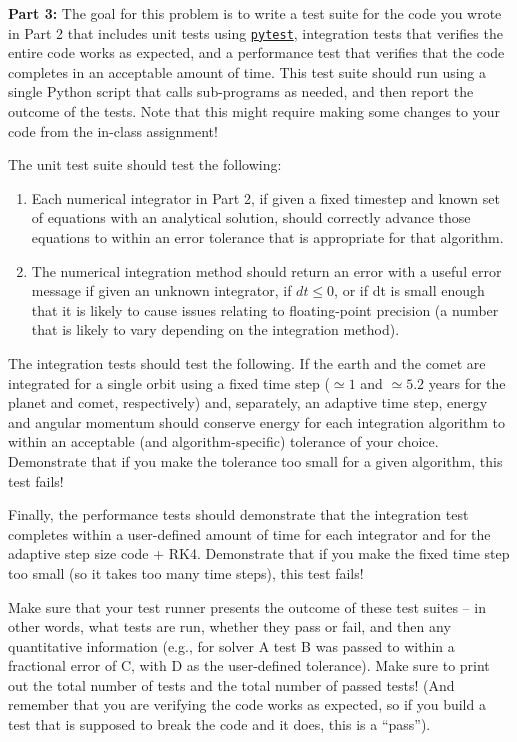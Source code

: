 \documentclass[10pt]{article}
\begin{document}
\newpage
\noindent 
{\large \textbf{Part 3:}}  The goal for this problem is to write a
test suite for the code you wrote in Part 2 that includes unit tests using
\href{https://docs.pytest.org/}{\texttt{pytest}}, 
integration tests that verifies the entire code works as expected,
and a performance test that verifies that the code completes in an
acceptable amount of time.  This test suite should run 
using a single Python script that calls sub-programs as needed, and
then report the outcome of the tests.  Note that this might require
making some changes to your code from the in-class assignment!

The unit test suite should test the following:

\begin{enumerate}

  \item Each numerical integrator in Part 2, if given a fixed timestep
and known set of equations with an analytical solution, should
correctly advance those equations to within an error tolerance that is
appropriate for that algorithm.

\item The numerical integration method should return an error with a
  useful error message if given
  an unknown integrator, if $dt \leq 0$, or if dt is small enough that
  it is likely to cause issues relating to floating-point precision
  (a number that is likely to vary depending on the integration
  method).

\end{enumerate}

The integration tests should test the following.  If the earth and the
comet are integrated for a single orbit using a fixed time step
($\simeq 1$ and $\simeq 5.2$ years for the planet and comet, respectively) and,
separately, an adaptive time step, energy and angular momentum should
conserve energy for each integration algorithm to within an acceptable
(and algorithm-specific) tolerance of your choice.  Demonstrate that
if you make the tolerance too small for a given algorithm, this test
fails!

Finally, the performance tests should demonstrate that the integration
test completes within a user-defined amount of time for each
integrator and for the adaptive step size code + RK4.  Demonstrate
that if you make the fixed time step too small (so it takes too many
time steps), this test fails!

Make sure that your test runner presents the outcome of these test
suites -- in other words, what tests are run, whether they pass or
fail, and then any quantitative information (e.g., for solver A test B
was passed to within a fractional error of C, with D as the
user-defined tolerance).  Make sure to print out the total number of
tests and the total number of passed tests!  (And remember that you
are verifying the code works as expected, so if you build a test that
is supposed to break the code and it does, this is a ``pass'').
\end{document}
